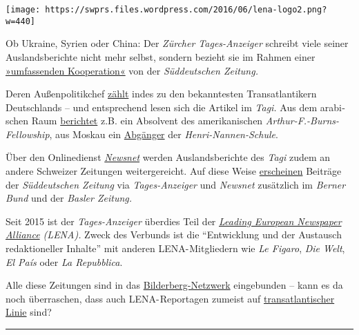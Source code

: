 \texttt{[image: https://swprs.files.wordpress.com/2016/06/lena-logo2.png?w=440]}

Ob Ukraine, Syrien oder Chi­na: Der \emph{Zürcher Tages-Anzeiger}
schreibt viele seiner Aus­lands­berichte nicht mehr selbst, sondern
bezieht sie im Rah­men einer
\href{https://www.tagesanzeiger.ch/schweiz/standard/In-eigener-Sache/story/24648194}{»umfassenden
Ko­ope­ra­tion«} von der \emph{Süd­deut­schen Zeitung.}

Deren Außen­politik­chef
\href{https://swprs.org/netzwerk-medien-deutschland/}{zählt} indes zu
den bekanntesten Trans­at­lan­tikern Deutsch­lands -- und ent­spre­chend
le­sen sich die Arti­kel im \emph{Tagi.} Aus dem ara­bi­schen Raum
\href{https://web.archive.org/web/20170606085220/http://www.icfj.org/sites/default/files/Kr\%C3\%BCger.pdf}{berichtet}
z.B. ein Absol­vent des ameri­ka­ni­schen
\emph{Arthur-F.-Burns-Fellowship}, aus Mos­kau ein
\href{https://spiegelkabinett-blog.blogspot.com/2016/09/julian-hans-von-der-suddeutschen.html}{Ab­gänger}
der \emph{Henri-Nannen-Schule}.

Über den Onlinedienst
\emph{\href{https://de.wikipedia.org/wiki/Newsnet}{Newsnet}} werden
Aus­lands­be­rich­te des \emph{Tagi} zudem an andere Schwei­zer
Zei­tungen wei­ter­ge­reicht. Auf diese Weise
\href{http://www.tagesanzeiger.ch/ausland/europa/Den-Ausloeser-zum-Krieg-habe-ich-gedrueckt/story/16330278}{er­scheinen}
Beiträge der \emph{Süd­deutschen Zeitung} via \emph{Tages­-Anzeiger} und
\emph{Newsnet} zu­sätz­lich im \emph{Berner Bund} und der \emph{Basler
Zeitung.}

Seit 2015 ist der \emph{Tages­-Anzeiger} über­dies Teil der
\emph{\href{https://de.wikipedia.org/wiki/Leading_European_Newspaper_Alliance}{Leading
European News­paper Alliance} (LENA).} Zweck des Ver­bunds ist die
``Ent­wick­lung und der Aus­tausch re­dak­tio­neller In­hal­te'' mit
anderen LENA- Mit­glie­dern wie \emph{Le Fi­g­aro}, \emph{Die Welt},
\emph{El País} oder \emph{La Re­pub­blica}.

Alle diese Zei­tungen sind in das
\href{https://swprs.files.wordpress.com/2016/07/bilderberg_teilnehmer_1954-2014.pdf}{Bilder­berg-Netz­werk}
ein­ge­bun­den -- kann es da noch über­raschen, dass auch
LENA- Repor­ta­gen zumeist auf
\href{http://www.tagesanzeiger.ch/ausland/europa/Wer-sagt-was-er-denkt-nobrriskiert-allesnobr/story/17225010}{trans­at­lan­tischer
Linie} sind?

\begin{center}\rule{0.5\linewidth}{\linethickness}\end{center}

